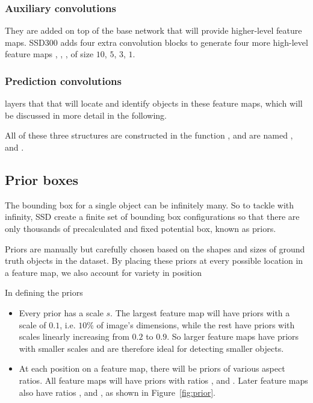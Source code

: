 \documentclass[journal,conference]{IEEEtran}
\begin{document}
\subsubsection{Auxiliary convolutions}
They are added on top of the base network that will provide higher-level feature maps. SSD300 adds four extra convolution blocks to generate four more high-level feature maps , , ,  of size $10$, $5$, $3$, $1$.

\subsubsection{Prediction convolutions} layers that that will locate and identify objects in these feature maps, which will be discussed in more detail in the following.


All of these three structures are constructed in the function , and are named ,  and .

\subsection{Prior boxes}
The bounding box for a single object can be infinitely many. So to tackle with infinity, SSD create a finite set of bounding box configurations so that there are only thousands of precalculated and fixed potential box, known as priors.

Priors are manually but carefully chosen based on the shapes and sizes of ground truth objects in the dataset. By placing these priors at every possible location in a feature map, we also account for variety in position

In defining the priors
\begin{itemize}
  \item Every prior has a scale $s$. The largest feature map  will have priors with a scale of $0.1$, i.e. $10\%$ of image's dimensions, while the rest have priors with scales linearly increasing from $0.2$ to $0.9$. So larger feature maps have priors with smaller scales and are therefore ideal for detecting smaller objects.
  \item At each position on a feature map, there will be priors of various aspect ratios. All feature maps will have priors with ratios ,  and . Later feature maps also have ratios ,  and , as shown in Figure~\ref{fig:prior}.
\end{itemize}
\end{document}
